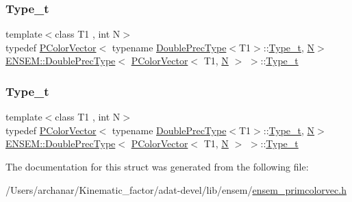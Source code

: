 \subsubsection{\texorpdfstring{Type\_t}{Type\_t}\hspace{0.1cm}{\footnotesize\ttfamily [2/3]}}
{\footnotesize\ttfamily template$<$class T1 , int N$>$ \\
typedef \mbox{\hyperlink{classENSEM_1_1PColorVector}{P\+Color\+Vector}}$<$ typename \mbox{\hyperlink{structENSEM_1_1DoublePrecType}{Double\+Prec\+Type}}$<$T1$>$\+::\mbox{\hyperlink{structENSEM_1_1DoublePrecType_3_01PColorVector_3_01T1_00_01N_01_4_01_4_af7639042ca77d3429dc5dc974ef5c87d}{Type\+\_\+t}}, \mbox{\hyperlink{adat__devel_2lib_2hadron_2operator__name__util_8cc_a7722c8ecbb62d99aee7ce68b1752f337}{N}}$>$ \mbox{\hyperlink{structENSEM_1_1DoublePrecType}{E\+N\+S\+E\+M\+::\+Double\+Prec\+Type}}$<$ \mbox{\hyperlink{classENSEM_1_1PColorVector}{P\+Color\+Vector}}$<$ T1, \mbox{\hyperlink{adat__devel_2lib_2hadron_2operator__name__util_8cc_a7722c8ecbb62d99aee7ce68b1752f337}{N}} $>$ $>$\+::\mbox{\hyperlink{structENSEM_1_1DoublePrecType_3_01PColorVector_3_01T1_00_01N_01_4_01_4_af7639042ca77d3429dc5dc974ef5c87d}{Type\+\_\+t}}}

\mbox{\label{structENSEM_1_1DoublePrecType_3_01PColorVector_3_01T1_00_01N_01_4_01_4_af7639042ca77d3429dc5dc974ef5c87d}} 
\subsubsection{\texorpdfstring{Type\_t}{Type\_t}\hspace{0.1cm}{\footnotesize\ttfamily [3/3]}}
{\footnotesize\ttfamily template$<$class T1 , int N$>$ \\
typedef \mbox{\hyperlink{classENSEM_1_1PColorVector}{P\+Color\+Vector}}$<$ typename \mbox{\hyperlink{structENSEM_1_1DoublePrecType}{Double\+Prec\+Type}}$<$T1$>$\+::\mbox{\hyperlink{structENSEM_1_1DoublePrecType_3_01PColorVector_3_01T1_00_01N_01_4_01_4_af7639042ca77d3429dc5dc974ef5c87d}{Type\+\_\+t}}, \mbox{\hyperlink{adat__devel_2lib_2hadron_2operator__name__util_8cc_a7722c8ecbb62d99aee7ce68b1752f337}{N}}$>$ \mbox{\hyperlink{structENSEM_1_1DoublePrecType}{E\+N\+S\+E\+M\+::\+Double\+Prec\+Type}}$<$ \mbox{\hyperlink{classENSEM_1_1PColorVector}{P\+Color\+Vector}}$<$ T1, \mbox{\hyperlink{adat__devel_2lib_2hadron_2operator__name__util_8cc_a7722c8ecbb62d99aee7ce68b1752f337}{N}} $>$ $>$\+::\mbox{\hyperlink{structENSEM_1_1DoublePrecType_3_01PColorVector_3_01T1_00_01N_01_4_01_4_af7639042ca77d3429dc5dc974ef5c87d}{Type\+\_\+t}}}



The documentation for this struct was generated from the following file\+:\begin{DoxyCompactItemize}
\item 
/\+Users/archanar/\+Kinematic\+\_\+factor/adat-\/devel/lib/ensem/\mbox{\hyperlink{adat-devel_2lib_2ensem_2ensem__primcolorvec_8h}{ensem\+\_\+primcolorvec.\+h}}\end{DoxyCompactItemize}
